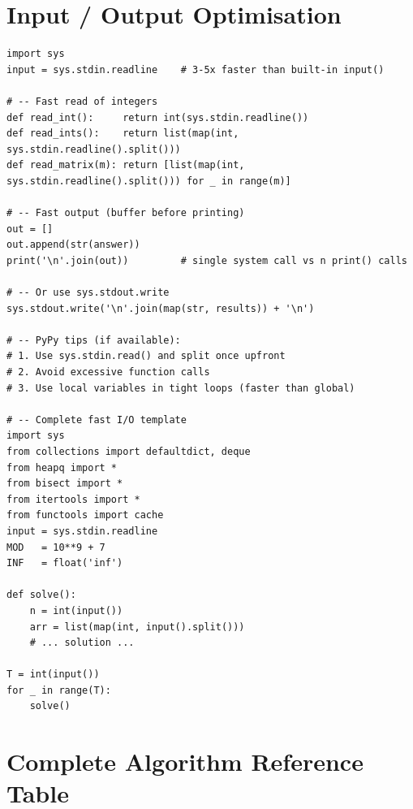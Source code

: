 \documentclass[11pt,a4paper]{report}
\begin{document}
\chapter{Input / Output Optimisation}

\begin{lstlisting}
import sys
input = sys.stdin.readline    # 3-5x faster than built-in input()

# -- Fast read of integers
def read_int():     return int(sys.stdin.readline())
def read_ints():    return list(map(int, sys.stdin.readline().split()))
def read_matrix(m): return [list(map(int, sys.stdin.readline().split())) for _ in range(m)]

# -- Fast output (buffer before printing)
out = []
out.append(str(answer))
print('\n'.join(out))         # single system call vs n print() calls

# -- Or use sys.stdout.write
sys.stdout.write('\n'.join(map(str, results)) + '\n')

# -- PyPy tips (if available):
# 1. Use sys.stdin.read() and split once upfront
# 2. Avoid excessive function calls
# 3. Use local variables in tight loops (faster than global)

# -- Complete fast I/O template
import sys
from collections import defaultdict, deque
from heapq import *
from bisect import *
from itertools import *
from functools import cache
input = sys.stdin.readline
MOD   = 10**9 + 7
INF   = float('inf')

def solve():
    n = int(input())
    arr = list(map(int, input().split()))
    # ... solution ...

T = int(input())
for _ in range(T):
    solve()
\end{lstlisting}

\chapter{Complete Algorithm Reference Table}
\end{document}
